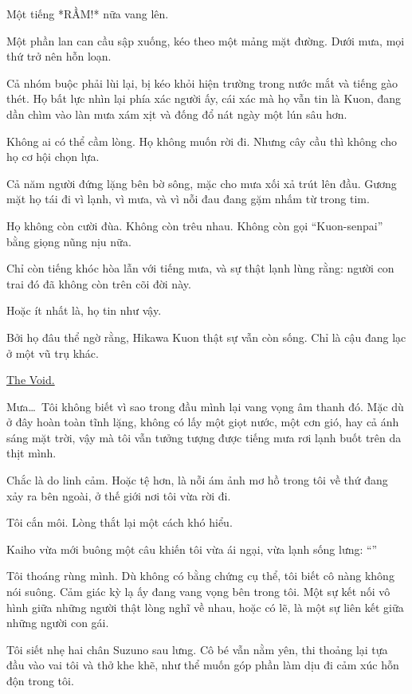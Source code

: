 \documentclass[../main.tex]{subfiles}
\begin{document}
Một tiếng *RẦM!* nữa vang lên.

Một phần lan can cầu sập xuống, kéo theo một mảng mặt đường. Dưới mưa, mọi thứ trở nên hỗn loạn.

Cả nhóm buộc phải lùi lại, bị kéo khỏi hiện trường trong nước mắt và tiếng gào thét. Họ bất lực nhìn lại phía xác người ấy, cái xác mà họ vẫn tin là Kuon, đang dần chìm vào làn mưa xám xịt và đống đổ nát ngày một lún sâu hơn.

Không ai có thể cầm lòng. Họ không muốn rời đi. Nhưng cây cầu thì không cho họ cơ hội chọn lựa.

\ct

Cả năm người đứng lặng bên bờ sông, mặc cho mưa xối xả trút lên đầu. Gương mặt họ tái đi vì lạnh, vì mưa, và vì nỗi đau đang gặm nhấm từ trong tim.

Họ không còn cười đùa. Không còn trêu nhau. Không còn gọi ``Kuon-senpai'' bằng giọng nũng nịu nữa.

Chỉ còn tiếng khóc hòa lẫn với tiếng mưa, và sự thật lạnh lùng rằng: người con trai đó đã không còn trên cõi đời này.

Hoặc ít nhất là, họ tin như vậy.

Bởi họ đâu thể ngờ rằng, Hikawa Kuon thật sự vẫn còn sống. Chỉ là cậu đang lạc ở một vũ trụ khác.

\begin{center}
    \uline{The Void.}
\end{center}

Mưa\dots\ Tôi không biết vì sao trong đầu mình lại vang vọng âm thanh đó. Mặc dù ở đây hoàn toàn tĩnh lặng, không có lấy một giọt nước, một cơn gió, hay cả ánh sáng mặt trời, vậy mà tôi vẫn tưởng tượng được tiếng mưa rơi lạnh buốt trên da thịt mình.

Chắc là do linh cảm. Hoặc tệ hơn, là nỗi ám ảnh mơ hồ trong tôi về thứ đang xảy ra bên ngoài, ở thế giới nơi tôi vừa rời đi.

Tôi cắn môi. Lòng thắt lại một cách khó hiểu.

Kaiho vừa mới buông một câu khiến tôi vừa ái ngại, vừa lạnh sống lưng: ``''

Tôi thoáng rùng mình. Dù không có bằng chứng cụ thể, tôi biết cô nàng không nói suông. Cảm giác kỳ lạ ấy đang vang vọng bên trong tôi. Một sự kết nối vô hình giữa những người thật lòng nghĩ về nhau, hoặc có lẽ, là một sự liên kết giữa những người con gái.

Tôi siết nhẹ hai chân Suzuno sau lưng. Cô bé vẫn nằm yên, thi thoảng lại tựa đầu vào vai tôi và thở khe khẽ, như thể muốn góp phần làm dịu đi cảm xúc hỗn độn trong tôi.
\end{document}
